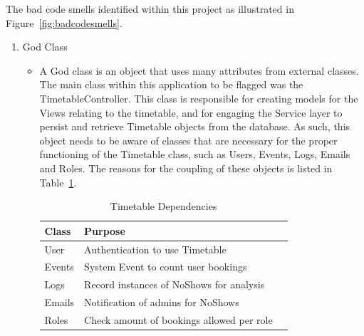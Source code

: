 The bad code smells identified within this project as illustrated in Figure~\ref{fig:badcodesmells}.

\begin{enumerate}
\item God Class
\begin{itemize}
\item A God class is an object that uses many attributes from external classes. The main class within this application to be flagged was the TimetableController. This class is responsible for creating models for the Views relating to the timetable, and for engaging the Service layer to persist and retrieve Timetable objects from the database. As such, this object needs to be aware of classes that are necessary for the proper functioning of the Timetable class, such as Users, Events, Logs, Emails and Roles. The reasons for the coupling of these objects is listed in Table~\ref{fig:godclass}.
\begin{table}[H]
\begin{center}
    \begin{tabular}{| l | l | p{2.3cm} |}
    \hline
    Class & Purpose\\ \hline
	User & Authentication to use Timetable \\ \hline
	Events & System Event to count user bookings \\ \hline
	Logs & Record instances of NoShows for analysis \\ \hline
	Emails & Notification of admins for NoShows \\ \hline
	Roles & Check amount of bookings allowed per role \\ \hline	
    \end{tabular}
\end{center}
\caption{Timetable Dependencies}
\label{fig:godclass}
\end{table}


\end{itemize}
\end{enumerate}
